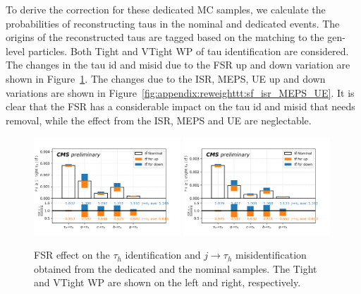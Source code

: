 To derive the correction for these dedicated MC samples, we calculate the
probabilities of reconstructing taus in the nominal and dedicated \ttbar events.
The origins of the reconstructed taus are tagged based on the matching to the
gen-level particles. Both Tight and VTight WP of tau identification are
considered. The changes in the tau id and misid due to the FSR up and down 
variation are shown in Figure~\ref{fig:appendix:reweighttt:sf_fsr}. The changes
due to the ISR, MEPS, UE up and down variations are shown in Figure~\ref{fig:appendix:reweighttt:sf_isr_MEPS_UE}.
It is clear that the FSR has a considerable impact on the tau id and misid that 
needs removal, while the effect from the ISR, MEPS and UE are neglectable.


\begin{figure}
    \centering
    \includegraphics[width=0.49\textwidth]{chapters/Appendix/sectionTTSyst/figures/2020_MCRatio_fsr_tauGenFlavor_tauTight.png}
    \includegraphics[width=0.49\textwidth]{chapters/Appendix/sectionTTSyst/figures/2020_MCRatio_fsr_tauGenFlavor_tauVTight.png}
    \caption{FSR effect on the $\tau_h$ identification and $j \to \tau_h$ misidentification obtained from the dedicated and the nominal \ttbar samples. 
    The Tight and VTight WP are shown on the left and right, respectively.
    }
    \label{fig:appendix:reweighttt:sf_fsr}
\end{figure}

